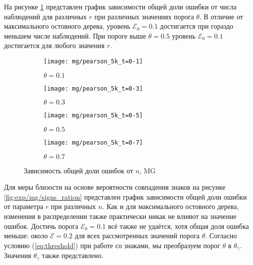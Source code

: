 На рисунке \ref{fig:exp/mg/5k} представлен график зависимости общей доли ошибки от числа наблюдений для различных $r$ при различных значениях порога $\theta$. В отличие от максимального остовного дерева, уровень $\mathcal{E}_0=0.1$ достигается при гораздо меньшем числе наблюдений. При пороге выше $\theta=0.5$ уровень $\mathcal{E}_0=0.1$ достигается для любого значения $r$.


\begin{figure}[H]
     \centering
     \begin{subfigure}[b]{0.49\textwidth}
         \centering
         \texttt{[image: mg/pearson\_5k\_t=0-1]}
         \caption{$\theta=0.1$}
     \end{subfigure}
     \hfill
     \begin{subfigure}[b]{0.49\textwidth}
         \centering
         \texttt{[image: mg/pearson\_5k\_t=0-3]}
         \caption{$\theta=0.3$}
     \end{subfigure}
     \vfill
     \begin{subfigure}[b]{0.49\textwidth}
         \centering
         \texttt{[image: mg/pearson\_5k\_t=0-5]}
         \caption{$\theta=0.5$}
     \end{subfigure}
     \hfill
     \begin{subfigure}[b]{0.49\textwidth}
         \centering
         \texttt{[image: mg/pearson\_5k\_t=0-7]}
         \caption{$\theta=0.7$}
     \end{subfigure}
     

        \caption{Зависимость общей доли ошибок от $n$, MG}
        \label{fig:exp/mg/5k}
\end{figure}  


Для меры близости на основе вероятности совпадения знаков на рисунке \ref{fig:exp/mg/signs_ration} представлен график зависимости общей доли ошибки от параметра $r$ при различных $n$. Как и для максимального остовного дерева, изменения в распределении также практически никак не влияют на значение ошибок. Достичь порога $\mathcal{E}_0=0.1$  всё также не удаётся, хотя общая доля ошибка меньше: около $\mathcal{E}=0.2$ для всех рассмотренных значений порога $\theta$. Согласно условию (\ref{eq:threshold}) при работе со знаками, мы преобразуем порог $\theta$ в $\theta_\gamma$. Значения $\theta_\gamma$ также представлено.


